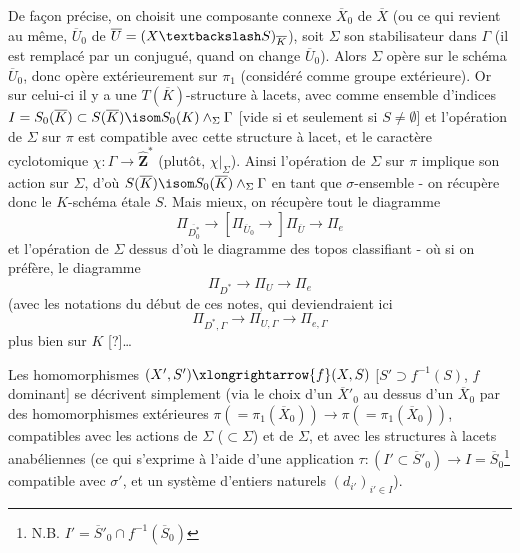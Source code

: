 De fa\c{c}on précise, on choisit une composante connexe $\overline{X}_0$ de $\overline{X}$ (ou ce qui revient au même, $\overline{U}_0$ de $\overline{U} = (X \textbackslash S)_{\overline{K}}$), soit $\Sigma$ son stabilisateur dans $\Gamma$ (il est remplacé par un conjugué, quand on change $\overline{U}_0$). Alors $\Sigma$ opère sur le schéma $\overline{U}_0$, donc opère extérieurement sur $\pi_1$ (considéré comme groupe extérieure). Or sur celui-ci il y a une $T(\overline{K})$-structure à lacets, avec comme ensemble d'indices $I = S_0(\overline{K}) \subset  S(\overline{K}) \isom S_0(K) \wedge_{\Sigma} \Gamma$ [vide si et seulement si $S \neq \emptyset$] et l'opération de $\Sigma$ sur $\pi$ est compatible avec cette structure à lacet, et le caractère cyclotomique $\chi: \Gamma \to \widehat{\mathbf{Z}}^*$ (plutôt, $\chi | _\Sigma$). Ainsi l'opération de $\Sigma$ sur $\pi$ implique son action sur $\Sigma$, d'où $S(\overline{K}) \isom S_0(\overline{K}) \wedge_{\Sigma} \Gamma$ en tant que $\sigma$-ensemble - on récupère donc le $K$-schéma étale $S$. Mais mieux, on récupère tout le diagramme
$$
\Pi_{\overline{D_0^*}} \to [\Pi_{\overline{U}_0} \to ] \Pi_{\overline{U}} \to \Pi_e
$$
et l'opération de $\Sigma$ dessus d'où le diagramme des topos classifiant - où si on préfère, le diagramme
$$
\Pi_{D^*} \to \Pi_U \to \Pi_e
$$
(avec les notations du début de ces notes, qui deviendraient ici
$$
\Pi_{D^*, \Gamma} \to \Pi_{U, \Gamma} \to \Pi_{e, \Gamma}
$$
plus bien sur $K$ [?]\dots

Les homomorphismes $(X', S') \xlongrightarrow{f} (X, S)$ [$S' \supset f^{-1}(S)$, $f$ dominant] se décrivent simplement (via le choix d'un $\overline{X}'_0$ au dessus d'un $\overline{X}_0$ par des homomorphismes extérieures $\pi (= \pi_1(\overline{X}_0)) \to \pi(= \pi_1(\overline{X}_0))$, compatibles avec les actions de $\Sigma$ ($\subset  \Sigma$) et de $\Sigma$, et avec les structures à lacets anabéliennes (ce qui s'exprime à l'aide d'une application $\tau: (I' \subset  \overline{S}'_0) \to I = \overline{S}_0$\footnote{N.B. $I' = \overline{S}'_0 \cap f^{-1}(\overline{S}_0)$} compatible avec $\sigma'$, et un système d'entiers naturels $(d_{i'})_{i' \in I}$).

